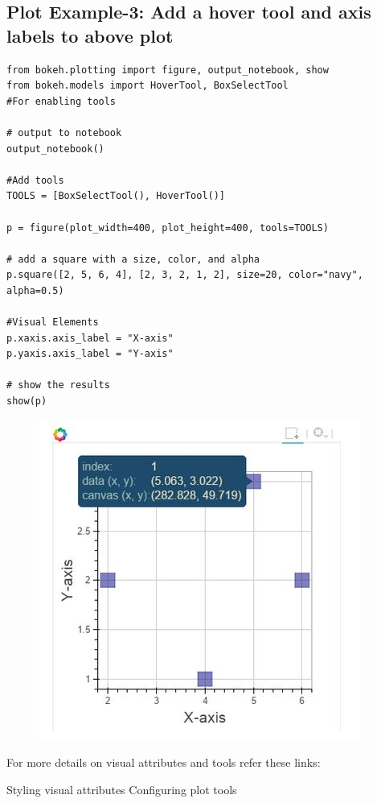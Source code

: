\documentclass[a4paper,12pt]{article}
\begin{document}
\subsection{Plot Example-3: Add a hover tool and axis labels to above plot}
\begin{framed}
	\begin{verbatim}
from bokeh.plotting import figure, output_notebook, show
from bokeh.models import HoverTool, BoxSelectTool 
#For enabling tools

# output to notebook
output_notebook()

#Add tools
TOOLS = [BoxSelectTool(), HoverTool()]

p = figure(plot_width=400, plot_height=400, tools=TOOLS)

# add a square with a size, color, and alpha
p.square([2, 5, 6, 4], [2, 3, 2, 1, 2], size=20, color="navy", alpha=0.5)

#Visual Elements
p.xaxis.axis_label = "X-axis"
p.yaxis.axis_label = "Y-axis"

# show the results
show(p)
\end{verbatim}
\end{framed}

\begin{figure}[h!]
\centering
\includegraphics[width=0.5\linewidth]{images/02-plotting-AV-scatterplot-interactive}
\caption{}
\label{fig:02-plotting-AV-scatterplot-interactive}
\end{figure}

For more details on visual attributes and tools refer these links:

Styling visual attributes
Configuring plot tools
 

%
\end{document}
